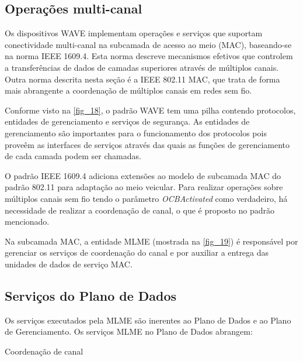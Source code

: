 \documentclass[
12pt,				%
openright,			%
oneside,			%
a4paper,			%
brazil,				%
]{abntex2}
\begin{document}
	\subsection{Operações multi-canal}
	
	\par Os dispositivos WAVE implementam operações e serviços que suportam conectividade multi-canal na subcamada de acesso ao meio (MAC), baseando-se na norma IEEE 1609.4. Esta norma descreve mecanismos efetivos que controlem a transferências de dados de camadas superiores através de múltiplos canais. Outra norma descrita nesta seção é a IEEE 802.11 MAC, que trata de forma mais abrangente a coordenação de múltiplos canais em redes sem fio.
	
	\par Conforme visto na \autoref{fig_18}, o padrão WAVE tem uma pilha contendo protocolos, entidades de gerenciamento e serviços de segurança. As entidades de gerenciamento são importantes para o funcionamento dos protocolos pois proveêm as interfaces de serviços através das quais as funções de gerenciamento de cada camada podem ser chamadas.
	
	\par O padrão IEEE 1609.4 adiciona extensões ao modelo de subcamada MAC do padrão 802.11 para adaptação ao meio veicular. Para realizar operações sobre múltiplos canais sem fio tendo o parâmetro \textit{OCBActivated} como verdadeiro, há necessidade de realizar a coordenação de canal, o que é proposto no padrão mencionado.
	
	\par Na subcamada MAC, a entidade MLME (mostrada na \autoref{fig_19}) é responsável por gerenciar os serviços de coordenação do canal e por auxiliar a entrega das unidades de dados de serviço MAC.
	
	\subsection{Serviços do Plano de Dados} 
	\label{subsec:Serviços do Plano de Dados}
	
	\par Os serviços executados pela MLME são inerentes ao Plano de Dados e ao Plano de Gerenciamento. Os serviços MLME no Plano de Dados abrangem:
	
	\begin{description}
        \item[Coordenação de canal]
    \end{description}
	
\end{document}
